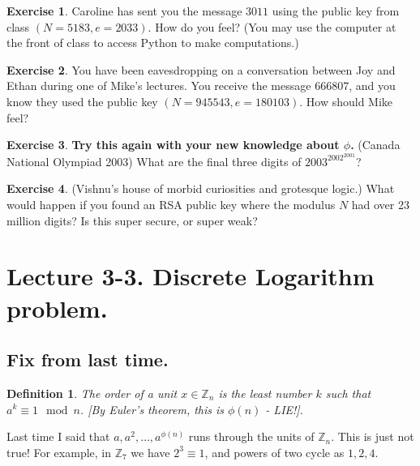 \documentclass[11pt]{article}
\newtheorem{dfn}[thm]{Definition}
\theoremstyle{definition}
\newtheorem{exercise}{Exercise}
\numberwithin{thm}{section}
\begin{document}
\begin{exercise} Caroline has sent you the message $3011$ using the public key from class $(N=5183, e=2033)$. How do you feel? (You may use the computer at the front of class to access Python to make computations.)
\end{exercise}

\begin{exercise} You have been eavesdropping on a conversation between Joy and Ethan during one of Mike's lectures. You receive the message $666807$, and you know they used the public key $(N=945543, e=180103)$. How should Mike feel?
\end{exercise}

\begin{exercise} \textbf{Try this again with your new knowledge about $\phi$.} (Canada National Olympiad 2003) What are the final three digits of $2003^{2002^{2001}}$?
\end{exercise}

\begin{exercise} (Vishnu's house of morbid curiosities and grotesque logic.) What would happen if you found an RSA public key where the modulus $N$ had over 23 million digits? Is this super secure, or super weak?
\end{exercise}

\newpage
\section{Lecture 3-3. Discrete Logarithm problem.}


\subsection{Fix from last time.}

\begin{dfn} The order of a unit $x \in \mathbb{Z}_n$ is the least number $k$ such that $a^k \equiv 1 \mod n$. [By Euler's theorem, this is $\phi(n)$ - LIE!].
\end{dfn}

Last time I said that $a, a^2, \ldots, a^{\phi(n)}$ runs through the units of $\mathbb{Z}_n$. This is just not true! For example, in $\mathbb{Z}_7$ we have $2^3 \equiv 1$, and powers of two cycle as $1,2,4$.
\end{document}

